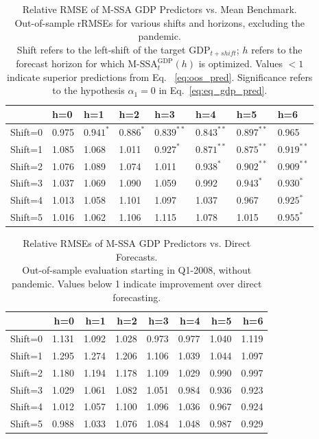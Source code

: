 \documentclass[11pt,a4paper]{article}
\begin{document}


\begin{table}[ht]

\caption{Relative RMSE of M-SSA GDP Predictors vs. Mean Benchmark.\\
Out-of-sample rRMSEs for various shifts and horizons, excluding the pandemic.\\
Shift refers to the left-shift of the target $\textrm{GDP}_{t+shift}$; $h$ refers to the forecast horizon for which $\textrm{M-SSA}_t^{\textrm{GDP}}(h)$ is optimized. 
Values $< 1$ indicate superior predictions from Eq.~ \eqref{eq:oos_pred}. Significance refers to the hypothesis $\alpha_1=0$ in Eq.~\eqref{eq:eq_gdp_pred}.
} 
\label{tab:rRMSE_mSSA_comp_mean_wc}
\centering
\begin{tabular}{llllllll}
  \hline
 & h=0 & h=1 & h=2 & h=3 & h=4 & h=5 & h=6 \\ 
  \hline
Shift=0 & 0.975 & $0.941^{*}$ & $0.886^{*}$ &$ 0.839^{**} $& $0.843^{**}$ &$ 0.897^{**} $& 0.965 \\ 
  Shift=1 & 1.085 & 1.068 & 1.011 & $0.927^{*} $& $0.871^{**}$ & $0.875^{**}$ & $0.919^{**}$ \\ 
  Shift=2 & 1.076 & 1.089 & 1.074 & 1.011 & $0.938^{*}$ &$ 0.902^{**} $& $0.909^{**} $\\ 
  Shift=3 & 1.037 & 1.069 & 1.090 & 1.059 & 0.992 & $0.943^* $&$ 0.930^*$ \\ 
  Shift=4 & 1.013 & 1.058 & 1.101 & 1.097 & 1.037 & 0.967 &$ 0.925^*$ \\ 
  Shift=5 & 1.016 & 1.062 & 1.106 & 1.115 & 1.078 & 1.015 & $0.955^*$ \\  
   \hline
\end{tabular}
\end{table}


\begin{table}[ht]
\caption{Relative RMSEs of M-SSA GDP Predictors vs. Direct Forecasts.\\
Out-of-sample evaluation starting in Q1-2008, without pandemic. Values below 1 indicate improvement over direct forecasting.
\label{tab:rRMSE_mSSA_comp_direct_without_covid7}}
\centering
\begin{tabular}{rrrrrrrr}
  \hline
 & h=0 & h=1 & h=2 & h=3 & h=4 & h=5 & h=6 \\ 
  \hline
Shift=0 & 1.131 & 1.092 & 1.028 & 0.973 & 0.977 & 1.040 & 1.119 \\ 
  Shift=1 & 1.295 & 1.274 & 1.206 & 1.106 & 1.039 & 1.044 & 1.097 \\ 
  Shift=2 & 1.180 & 1.194 & 1.178 & 1.109 & 1.029 & 0.990 & 0.997 \\ 
  Shift=3 & 1.029 & 1.061 & 1.082 & 1.051 & 0.984 & 0.936 & 0.923 \\ 
  Shift=4 & 1.012 & 1.057 & 1.100 & 1.096 & 1.036 & 0.967 & 0.924 \\ 
  Shift=5 & 0.988 & 1.033 & 1.076 & 1.084 & 1.048 & 0.987 & 0.929 \\  
   \hline
\end{tabular}
\end{table}
\end{document}

